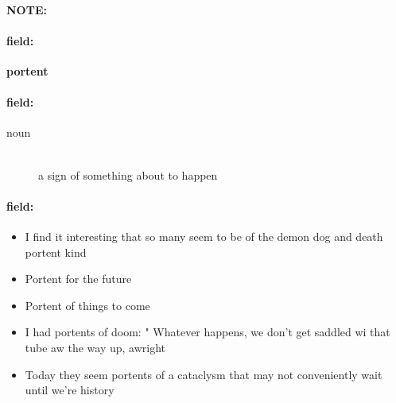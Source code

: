 \documentclass[12pt]{article}
\newenvironment{note}{\paragraph{NOTE:}}{}
\newenvironment{field}{\paragraph{field:}}{}
\begin{document}
\begin{note}
\begin{field}
\textbf{\large portent}
\end{field}


\begin{field}
\begin{description}
\item[noun] \hfill \\ 
a sign of something about to happen

\end{description}
\end{field}

\begin{field}
\begin{itemize}
\item I find it interesting that so many seem to be of the demon dog and death portent kind
\item Portent for the future
\item Portent of things to come
\item I had portents of doom: " Whatever happens, we don't get saddled wi that tube aw the way up, awright
\item Today they seem portents of a cataclysm that may not conveniently wait until we're history
\end{itemize}
\end{field}
\end{note}
\end{document}
